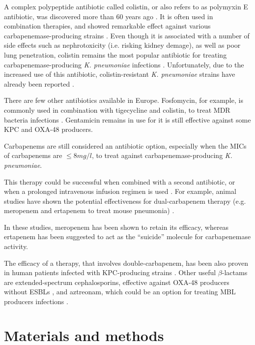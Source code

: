 \documentclass[11pt]{report}
\begin{document}
A complex polypeptide antibiotic called colistin, or also refers to as polymyxin E antibiotic, was discovered more than 60 years ago \cite{karaiskos2014multidrug, rodriguez2015diagnosis}.
It is often used in combination therapies, and showed remarkable effect against various carbapenemase-producing strains \cite{falagas2013antibiotic, temkin2014carbapenem}.
Even though it is associated with a number of side effects such as nephrotoxicity (i.e. risking kidney demage), as well as poor lung penetration, colistin remains the most popular antibiotic for treating carbapenemase-producing \emph{K. pneumoniae} infections \cite{karaiskos2014multidrug, rodriguez2015diagnosis}.
Unfortunately, due to the increased use of this antibiotic, 
colistin-resistant \emph{K. pneumoniae} strains have already been reported \cite{mammina2012ongoing}.

There are few other antibiotics available in Europe. Fosfomycin, for example, is commonly used in combination with tigecycline and colistin, to treat MDR bacteria infections \cite{pontikis2014outcomes}.
Gentamicin remains in use for it is still effective against some KPC and OXA-48 producers.

Carbapenems are still considered an antibiotic option, especially when the MICs of carbapenems are $\le 8mg/l$, to treat against carbapenemase-producing \emph{K. pneumoniae}.

This therapy could be successful when combined with a second antibiotic, or when a prolonged intravenous infusion regimen is used \cite{tzouvelekis2014treating, daikos2014carbapenemase, tumbarello2012predictors}.
For example, animal studies have shown the potential effectiveness for dual-carbapenem therapy (e.g. meropenem and ertapenem to treat mouse pneumonia) 
\cite{wiskirchen2014vivo}.

In these studies, meropenem has been shown to retain its efficacy, whereas ertapenem has been suggested to act as the ``suicide'' molecule for carbapenemase activity.

The efficacy of a therapy, that involves double-carbapenem, has been also proven in human patients infected with KPC-producing strains \cite{giamarellou2013effectiveness}.
Other useful $\beta$-lactams are extended-spectrum cephalosporins, effective against OXA-48 producers without ESBLs \cite{mimoz2012broad}, and aztreonam, which could be an option for treating MBL producers infections \cite{nordmann2011emerging}.

\chapter{Materials and methods}
\end{document}
